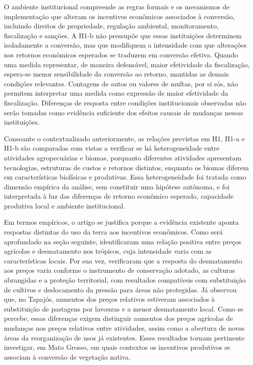 O ambiente institucional compreende as regras formais e os mecanismos de implementação que alteram os incentivos econômicos associados à conversão, incluindo direitos de propriedade, regulação ambiental, monitoramento, fiscalização e sanções. A H1-b não pressupõe que essas instituições determinem isoladamente a conversão, mas que modifiquem a intensidade com que alterações nos retornos econômicos esperados se traduzem em conversão efetiva. Quando uma medida representar, de maneira defensável, maior efetividade da fiscalização, espera-se menor sensibilidade da conversão ao retorno, mantidas as demais condições relevantes. Contagens de autos ou valores de multas, por si sós, não permitem interpretar uma medida como expressão de maior efetividade da fiscalização. Diferenças de resposta entre condições institucionais observadas não serão tomadas como evidência suficiente dos efeitos causais de mudanças nessas instituições.

Consoante o contextualizado anteriormente, as relações previstas em H1, H1-a e H1-b são comparadas com vistas a verificar se há heterogeneidade entre atividades agropecuárias e biomas, porquanto diferentes atividades apresentam tecnologias, estruturas de custos e retornos distintos, enquanto os biomas diferem em características biofísicas e produtivas. Essa heterogeneidade foi tratada como dimensão empírica da análise, sem constituir uma hipótese autônoma, e foi interpretada à luz das diferenças de retorno econômico esperado, capacidade produtiva local e ambiente institucional. 

Em termos empíricos, o artigo se justifica porque a evidência existente aponta respostas distintas do uso da terra aos incentivos econômicos. Como será aprofundado na seção seguinte,  identificaram uma relação positiva entre preços agrícolas e desmatamento nos trópicos, cuja intensidade varia com as características locais. Por sua vez,  verificaram que a resposta do desmatamento aos preços varia conforme o instrumento de conservação adotado, as culturas abrangidas e a proteção territorial, com resultados compatíveis com substituição de cultivos e deslocamento da pressão para áreas não protegidas. Já  observou que, no Tapajós, aumentos dos preços relativos estiveram associados à substituição de pastagens por lavouras e a menor desmatamento local. Como se percebe, essas diferenças exigem distinguir aumentos dos preços agrícolas de mudanças nos preços relativos entre atividades, assim como a abertura de novas áreas da reorganização de usos já existentes. Esses resultados tornam pertinente investigar, em Mato Grosso, em quais contextos os incentivos produtivos se associam à conversão de vegetação nativa. 

